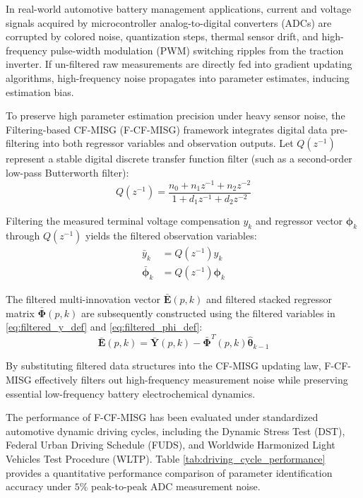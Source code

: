 In real-world automotive battery management applications, current and voltage signals acquired by microcontroller analog-to-digital converters (ADCs) are corrupted by colored noise, quantization steps, thermal sensor drift, and high-frequency pulse-width modulation (PWM) switching ripples from the traction inverter. If un-filtered raw measurements are directly fed into gradient updating algorithms, high-frequency noise propagates into parameter estimates, inducing estimation bias.

To preserve high parameter estimation precision under heavy sensor noise, the Filtering-based CF-MISG (F-CF-MISG) framework integrates digital data pre-filtering into both regressor variables and observation outputs. Let $Q(z^{-1})$ represent a stable digital discrete transfer function filter (such as a second-order low-pass Butterworth filter):
\begin{equation}
Q(z^{-1}) = \frac{n_0 + n_1 z^{-1} + n_2 z^{-2}}{1 + d_1 z^{-1} + d_2 z^{-2}}
\label{eq:butterworth_filter_tf}
\end{equation}

Filtering the measured terminal voltage compensation $y_k$ and regressor vector $\boldsymbol{\phi}_k$ through $Q(z^{-1})$ yields the filtered observation variables:
\begin{align}
\bar{y}_k &= Q(z^{-1}) y_k \label{eq:filtered_y_def} \\
\bar{\boldsymbol{\phi}}_k &= Q(z^{-1}) \boldsymbol{\phi}_k \label{eq:filtered_phi_def}
\end{align}

The filtered multi-innovation vector $\bar{\mathbf{E}}(p, k)$ and filtered stacked regressor matrix $\bar{\boldsymbol{\Phi}}(p, k)$ are subsequently constructed using the filtered variables in \eqref{eq:filtered_y_def} and \eqref{eq:filtered_phi_def}:
\begin{equation}
\bar{\mathbf{E}}(p, k) = \bar{\mathbf{Y}}(p, k) - \bar{\boldsymbol{\Phi}}^T(p, k) \hat{\boldsymbol{\theta}}_{k-1}
\label{eq:filtered_innovation_vector_def}
\end{equation}

By substituting filtered data structures into the CF-MISG updating law, F-CF-MISG effectively filters out high-frequency measurement noise while preserving essential low-frequency battery electrochemical dynamics.

The performance of F-CF-MISG has been evaluated under standardized automotive dynamic driving cycles, including the Dynamic Stress Test (DST), Federal Urban Driving Schedule (FUDS), and Worldwide Harmonized Light Vehicles Test Procedure (WLTP). Table \ref{tab:driving_cycle_performance} provides a quantitative performance comparison of parameter identification accuracy under $5\%$ peak-to-peak ADC measurement noise.

